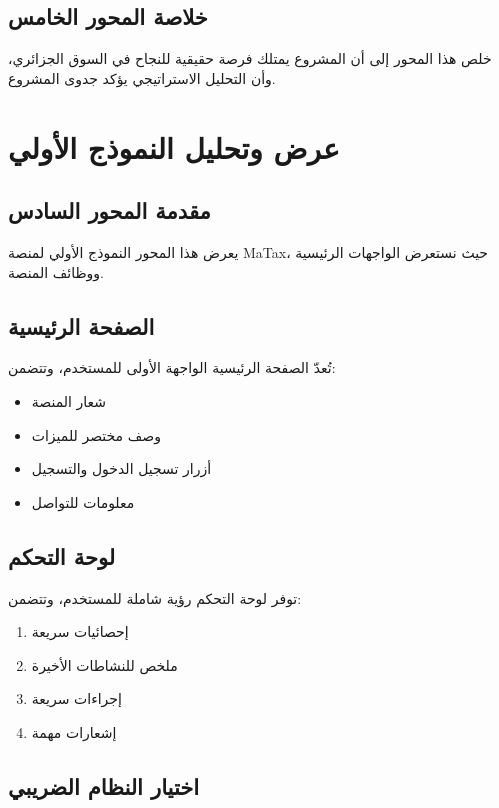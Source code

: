 \documentclass[12pt, a4paper, twoside]{report}
\begin{document}
\section{خلاصة المحور الخامس}

خلص هذا المحور إلى أن المشروع يمتلك فرصة حقيقية للنجاح في السوق الجزائري، وأن التحليل الاستراتيجي يؤكد جدوى المشروع.

\newpage

\chapter{عرض وتحليل النموذج الأولي}

\section{مقدمة المحور السادس}

يعرض هذا المحور النموذج الأولي لمنصة MaTax، حيث نستعرض الواجهات الرئيسية ووظائف المنصة.

\section{الصفحة الرئيسية}

تُعدّ الصفحة الرئيسية الواجهة الأولى للمستخدم، وتتضمن:
\begin{itemize}
    \item شعار المنصة
    \item وصف مختصر للميزات
    \item أزرار تسجيل الدخول والتسجيل
    \item معلومات للتواصل
\end{itemize}

\section{لوحة التحكم}

توفر لوحة التحكم رؤية شاملة للمستخدم، وتتضمن:
\begin{enumerate}
    \item إحصائيات سريعة
    \item ملخص للنشاطات الأخيرة
    \item إجراءات سريعة
    \item إشعارات مهمة
\end{enumerate}

\section{اختيار النظام الضريبي}
\end{document}
